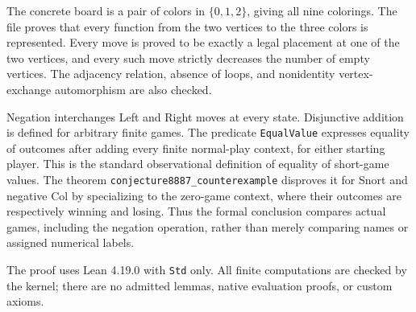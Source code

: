 \documentclass[10pt]{article}
\begin{document}
The concrete board is a pair of colors in $\{0,1,2\}$, giving all nine
colorings. The file proves that every function from the two vertices to
the three colors is represented. Every move is proved to be exactly a
legal placement at one of the two vertices, and every such move strictly
decreases the number of empty vertices. The adjacency relation, absence
of loops, and nonidentity vertex-exchange automorphism are also checked.

Negation interchanges Left and Right moves at every state. Disjunctive
addition is defined for arbitrary finite games. The predicate
\texttt{EqualValue} expresses equality of outcomes after adding every
finite normal-play context, for either starting player. This is the
standard observational definition of equality of short-game values.
The theorem \texttt{conjecture8887\_counterexample} disproves it for Snort
and negative Col by specializing to the zero-game context, where their
outcomes are respectively winning and losing. Thus the formal conclusion
compares actual games, including the negation operation, rather than
merely comparing names or assigned numerical labels.

The proof uses Lean 4.19.0 with \texttt{Std} only. All finite computations
are checked by the kernel; there are no admitted lemmas, native evaluation
proofs, or custom axioms.
\end{document}
